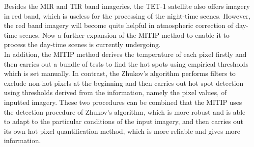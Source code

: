 \noindent Besides the MIR and TIR band imageries, the TET-1 satellite also offers imagery in red band, which is useless for the processing of the night-time scenes. However, the red band imagery will become quite helpful in atmospheric correction of day-time scenes. Now a further expansion of the MITIP method to enable it to process the day-time scenes is currently undergoing.\\

\noindent In addition, the MITIP method derives the temperature of each pixel firstly and then carries out a bundle of tests to find the hot spots using empirical thresholds which is set manually. In contrast, the Zhukov's algorithm performs filters to exclude non-hot pixels at the beginning and then carries out hot spot detection using thresholds derived from the information, namely the pixel values, of inputted imagery. These two procedures can be combined that the MITIP uses the detection procedure of Zhukov's algorithm, which is more robust and is able to adapt to the particular conditions of the input imagery, and then carries out its own hot pixel quantification method, which is more reliable and gives more information.\\